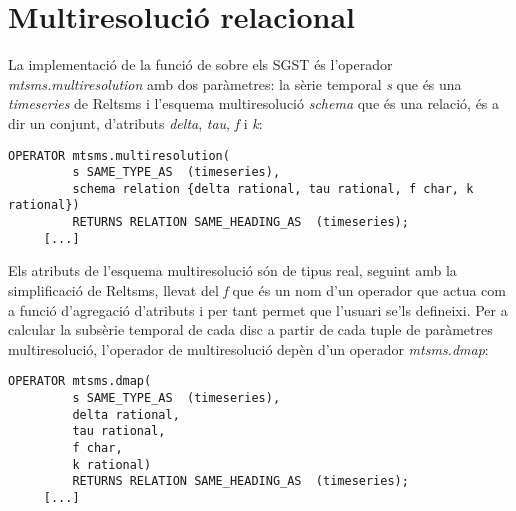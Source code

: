 








\section{Multiresolució relacional}


La implementació de la funció de 
sobre els \gls{SGST} és l'operador \emph{mtsms.multiresolution} amb
dos paràmetres: la sèrie temporal \emph{s} que és una
\emph{timeseries} de Reltsms i l'esquema multiresolució \emph{schema}
que és una relació, és a dir un conjunt, d'atributs \emph{delta},
\emph{tau}, \emph{f} i \emph{k}:

\begin{lstlisting}[style=tutorialD]
OPERATOR mtsms.multiresolution(
         s SAME_TYPE_AS  (timeseries),   
         schema relation {delta rational, tau rational, f char, k rational}) 
         RETURNS RELATION SAME_HEADING_AS  (timeseries);
     [...]
\end{lstlisting}
       



Els atributs de l'esquema multiresolució són de tipus real, seguint
amb la simplificació de Reltsms, llevat del \emph{f} que és un nom
d'un operador que actua com a funció d'agregació d'atributs i per tant
permet que l'usuari se'ls defineixi. Per a calcular la subsèrie
temporal de cada disc a partir de cada tuple de paràmetres
multiresolució, l'operador de multiresolució depèn d'un operador
\emph{mtsms.dmap}:
\begin{lstlisting}[style=tutorialD]
OPERATOR mtsms.dmap(
         s SAME_TYPE_AS  (timeseries),   
         delta rational, 
         tau rational,         
         f char,         
         k rational) 
         RETURNS RELATION SAME_HEADING_AS  (timeseries);
     [...]
\end{lstlisting}


